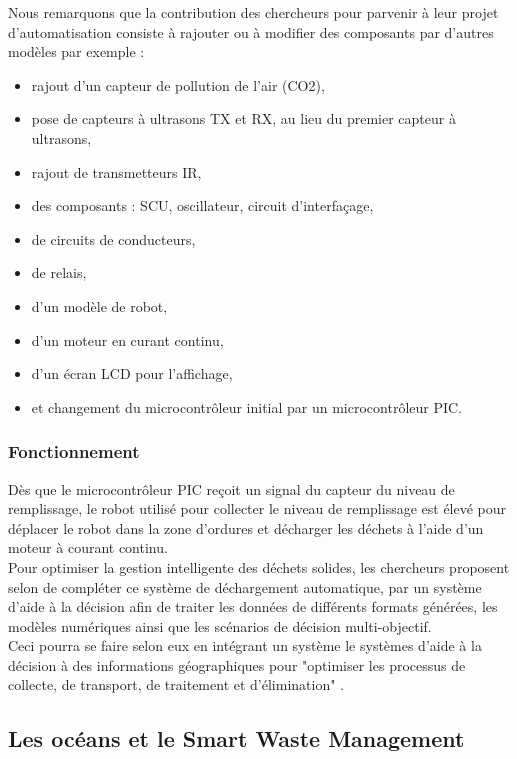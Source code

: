 \documentclass[a4paper,12pt]{report}
\begin{document}
Nous remarquons que la contribution des chercheurs pour parvenir à leur projet d'automatisation consiste à rajouter ou à modifier des composants par d'autres modèles par exemple :
\begin{itemize}
\item rajout d'un capteur de pollution de l'air (CO2),
\item pose de capteurs à ultrasons TX et RX, au lieu du premier capteur à ultrasons,
\item rajout de transmetteurs IR,
\item des composants : SCU, oscillateur, circuit d'interfaçage,
\item de circuits de conducteurs,
\item de relais,
\item d'un modèle de robot,
\item d'un moteur en curant continu,
\item d'un écran LCD pour l'affichage,
\item et changement du microcontrôleur initial par un microcontrôleur PIC.\\
\end{itemize}
\subsubsection*{Fonctionnement}
Dès que le microcontrôleur PIC reçoit un signal du capteur du niveau de remplissage, le robot utilisé pour collecter le niveau de remplissage est élevé pour déplacer le robot dans la zone d'ordures et décharger les déchets à l'aide d'un moteur à courant continu. \\ 
Pour optimiser la gestion intelligente des déchets solides, les chercheurs proposent selon \cite{ref19} de compléter ce système de déchargement automatique, par un système d'aide à la décision afin de traiter les données de différents formats générées, les modèles numériques ainsi que les scénarios de décision multi-objectif. \\
Ceci pourra se faire selon eux en intégrant un système le systèmes d'aide à la décision à des informations géographiques pour "optimiser les processus de collecte, de transport, de traitement et d'élimination" \cite{ref19}.

\subsection{Les océans et le Smart Waste Management}
\end{document}
